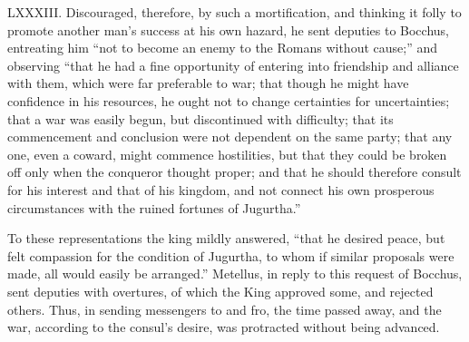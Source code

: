 LXXXIII. Discouraged, therefore, by such a mortification, and thinking
it folly to promote another man's success at his own hazard, he sent
deputies to Bocchus, entreating him ``not to become an enemy to the
Romans without cause;'' and observing ``that he had a fine opportunity
of entering into friendship and alliance with them, which were far
preferable to war; that though he might have confidence in his
resources, he ought not to change certainties for uncertainties; that
a war was easily begun, but discontinued with difficulty; that its
commencement and conclusion were not dependent on the same party; that
any one, even a coward, might commence hostilities, but that they
could be broken off only when the conqueror thought proper; and that
he should therefore consult for his interest and that of his kingdom,
and not connect his own prosperous circumstances with the ruined
fortunes of Jugurtha.''

To these representations the king mildly answered, ``that he desired
peace, but felt compassion for the condition of Jugurtha, to whom if
similar proposals were made, all would easily be arranged.'' Metellus,
in reply to this request of Bocchus, sent deputies with overtures, of
which the King approved some, and rejected others. Thus, in sending
messengers to and fro, the time passed away, and the war, according to
the consul's desire, was protracted without being advanced.


